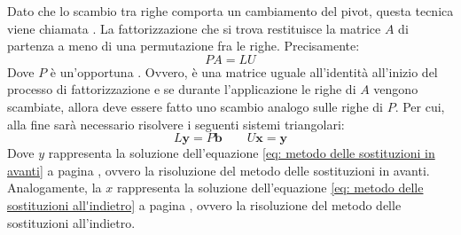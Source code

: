 \highspace
Dato che lo scambio tra righe comporta un cambiamento del pivot, questa tecnica viene chiamata . La fattorizzazione che si trova restituisce la matrice $A$ di partenza a meno di una permutazione fra le righe. Precisamente:
\begin{equation}\label{eq: pivoting}
    PA = LU
\end{equation}
Dove $P$ è un'opportuna . Ovvero, è una matrice uguale all'identità all'inizio del processo di fattorizzazione e se durante l'applicazione le righe di $A$ vengono scambiate, allora deve essere fatto uno scambio analogo sulle righe di $P$. Per cui, alla fine sarà necessario risolvere i seguenti sistemi triangolari:
\begin{equation}\label{eq: pivoting - sistemi triangolari}
    L\mathbf{y} = P\mathbf{b} \hspace{2em} U\mathbf{x} = \mathbf{y}
\end{equation}
Dove $y$ rappresenta la soluzione dell'equazione \ref{eq: metodo delle sostituzioni in avanti} a pagina \pageref{eq: metodo delle sostituzioni in avanti}, ovvero la risoluzione del metodo delle sostituzioni in avanti. Analogamente, la $x$ rappresenta la soluzione dell'equazione \ref{eq: metodo delle sostituzioni all'indietro} a pagina \pageref{eq: metodo delle sostituzioni all'indietro}, ovvero la risoluzione del metodo delle sostituzioni all'indietro.